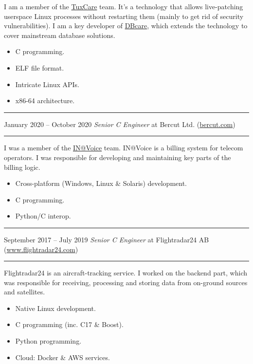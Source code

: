 \documentclass[11pt]{article}
\newcommand\CXX{C\nolinebreak[4]\hspace{-.05em}\raisebox{.4ex}{\relsize{-3}{\textbf{++}}}}
\newcommand\CvSmallSkipLength{0.5em}
\newcommand\CvSkip[1]{\vspace{#1}}
\newcommand\CvSmallSkip{\CvSkip{\CvSmallSkipLength}}
\newcommand\CvRule{\begingroup\color{CvRuleColor}\hrule\endgroup}
\newcommand\CvWorkplaceHeader[5]{\begingroup%
  \CvRule\nopagebreak%
  \fboxsep0pt%
  \colorbox{CvWorkplaceHeaderColor}{%
    \begin{minipage}{\linewidth-2\fboxsep}%
\CvSmallSkip%
#1 -- #2 \hfill \textit{#3} at #4 (\href{http://#5/}{#5})%
\CvSmallSkip%
    \end{minipage}%
  }%
  \CvRule%
\endgroup%
}
\newenvironment{CvWorkplaceDescription}{%
    \begingroup\setlength\parskip{\CvSmallSkipLength}%
  }{%
    \CvSmallSkip\endgroup%
  }
\begin{document}
\begin{CvWorkplaceDescription}
I am a member of the \href{https://tuxcare.com/}{TuxCare} team.
It's a technology that allows live-patching userspace Linux processes without
restarting them (mainly to get rid of security vulnerabilities).
I am a key developer of \href{https://tuxcare.com/live-patching-services/databasecare/}{DBcare},
which extends the technology to cover mainstream database solutions.

\begin{itemize}[noitemsep]
  \item C programming.
  \item ELF file format.
  \item Intricate Linux APIs.
  \item x86-64 architecture.
\end{itemize}
\end{CvWorkplaceDescription}

\CvWorkplaceHeader{January 2020}{October 2020}{Senior {\CXX} Engineer}{Bercut Ltd.}{bercut.com}

\begin{CvWorkplaceDescription}
I was a member of the \href{https://bercut.com/products/in-voice/}{IN@Voice}
team.
IN@Voice is a billing system for telecom operators.
I was responsible for developing and maintaining key parts of the billing
logic.

\begin{itemize}[noitemsep]
  \item Cross-platform (Windows, Linux \& Solaris) development.
  \item {\CXX} programming.
  \item Python/{\CXX} interop.
\end{itemize}
\end{CvWorkplaceDescription}

\CvWorkplaceHeader{September 2017}{July 2019}{Senior {\CXX} Engineer}{Flightradar24 AB}{www.flightradar24.com}

\begin{CvWorkplaceDescription}
Flightradar24 is an aircraft-tracking service.
I worked on the backend part, which was responsible for receiving, processing
and storing data from on-ground sources and satellites.

\begin{itemize}[noitemsep]
  \item Native Linux development.
  \item {\CXX} programming (inc. {\CXX}17 \& Boost).
  \item Python programming.
  \item Cloud: Docker \& AWS services.
\end{itemize}
\end{CvWorkplaceDescription}
\end{document}
